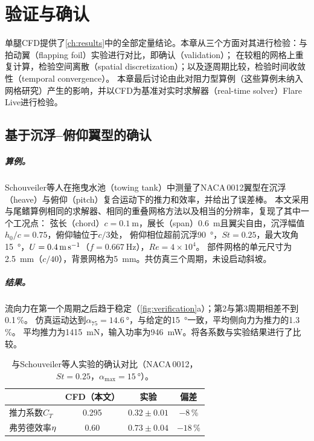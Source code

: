 \chapter{验证与确认}
\label{ch:verification}

单腿CFD提供了\cref{ch:results}中的全部定量结论。本章从三个方面对其进行检验：与拍动翼（flapping foil）实验进行对比，即确认（validation）；
在较粗的网格上重复计算，检验空间离散（spatial discretization）；以及逐周期比较，检验时间收敛性（temporal convergence）。
本章最后讨论由此对阻力型算例（这些算例未纳入网格研究）产生的影响，并以CFD为基准对实时求解器（real-time solver）Flare Live进行检验。

\section{基于沉浮--俯仰翼型的确认}
\label{sec:ver-v1}

\paragraph{算例。}Schouveiler等人\cite{Schouveiler2005}在拖曳水池（towing tank）中测量了NACA\,0012翼型在沉浮（heave）与俯仰（pitch）复合运动下的推力和效率，并给出了误差棒。
本文采用与尾鳍算例相同的求解器、相同的重叠网格方法以及相当的分辨率，复现了其中一个工况点：
弦长（chord）$c=\SI{0.1}{\metre}$，展长（span）\SI{0.6}{\metre}且翼尖自由，沉浮幅值$h_0/c=0.75$，俯仰轴位于$c/3$处，
俯仰相位超前沉浮\SI{90}{\degree}，$\mathit{St}=0.25$，最大攻角\SI{15}{\degree}，$U=\SI{0.4}{\metre\per\second}$（$f=\SI{0.667}{\hertz}$），$\mathit{Re}=4\times10^4$。
部件网格的单元尺寸为\SI{2.5}{\milli\metre}（$c/40$），背景网格为\SI{5}{\milli\metre}。共仿真三个周期，未设启动斜坡。

\paragraph{结果。}流向力在第一个周期之后趋于稳定（\cref{fig:verification}a）；第2与第3周期相差不到0.1\,\%。
仿真运动达到$\alpha_{75}=\SI{14.6}{\degree}$，与给定的\SI{15}{\degree}一致，平均侧向力为推力的1.3\,\%。
平均推力为\SI{1415}{\milli\newton}，输入功率为\SI{946}{\milli\watt}。将各系数与实验结果进行了比较。

\begin{table}[t]
  \centering
  \caption[与Schouveiler等人实验的确认对比]{与Schouveiler等人\cite{Schouveiler2005}实验的确认对比（NACA\,0012，$\mathit{St}=0.25$，$\alpha_\text{max}=\SI{15}{\degree}$）。}
  \label{tab:v1}
  \small
  \begin{tabular}{@{}lccc@{}}
    \toprule
    & CFD（本文） & 实验 & 偏差 \\
    \midrule
    推力系数$C_T$ & 0.295 & $0.32\pm0.01$ & $-8$\,\% \\
    弗劳德效率$\eta$ & 0.60 & $0.73\pm0.04$ & $-18$\,\% \\
    \bottomrule
  \end{tabular}
\end{table}

